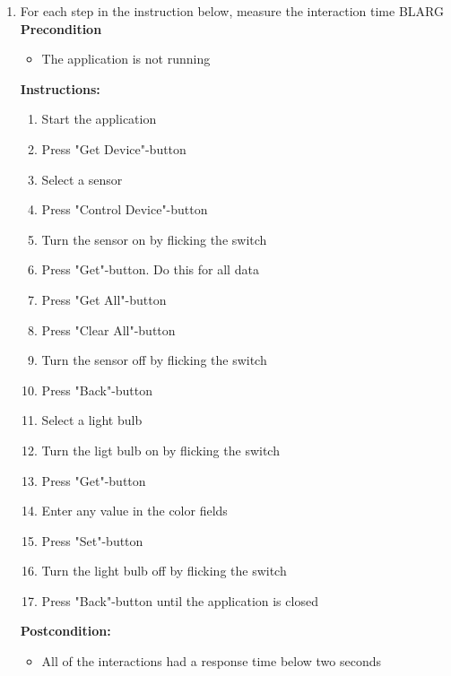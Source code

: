 \documentclass[a4paper]{article}
\newlength{\testlabellength}
\newenvironment{testlist}{\begin{enumerate}[label=\bfseries Instruction \thesubsection.\arabic* , labelindent=0pt, labelwidth=\testlabellength , leftmargin=2cm]}{\end{enumerate}}
\newenvironment{precondition}{
{\color{white}BLARG}\\ 
\textbf{Precondition}
\begin{itemize}[labelindent=0cm, labelwidth=2cm , leftmargin=1cm]
}
{\end{itemize}}
\newenvironment{instruction}{
\textbf{Instructions:}
\begin{enumerate}[label=\bfseries  \arabic*., labelindent=0cm, labelwidth=2cm , leftmargin=1cm]
}
{\end{enumerate}}
\newenvironment{postcondition}{
\textbf{Postcondition:}
\begin{itemize}[labelindent=0cm, labelwidth=2cm , leftmargin=1cm]
}
{\end{itemize}}
\begin{document}
\begin{appendices}
\begin{testlist}
	\item For each step in the instruction below, measure the interaction time
		\begin{precondition}
			\item The application is not running
		\end{precondition}
		\begin{instruction}
			\item Start the application
            \item Press "Get Device"-button
            \item Select a sensor
            \item Press "Control Device"-button
            \item Turn the sensor on by flicking the switch
            \item Press "Get"-button. Do this for all data
            \item Press "Get All"-button
            \item Press "Clear All"-button
            \item Turn the sensor off by flicking the switch
            \item Press "Back"-button
            \item Select a light bulb
            \item Turn the ligt bulb on by flicking the switch
            \item Press "Get"-button
            \item Enter any value in the color fields
            \item Press "Set"-button
            \item Turn the light bulb off by flicking the switch
            \item Press "Back"-button until the application is closed
		\end{instruction}
		\begin{postcondition}
			\item All of the interactions had a response time below two seconds
		\end{postcondition}


\end{testlist}
\end{appendices}
\end{document}
